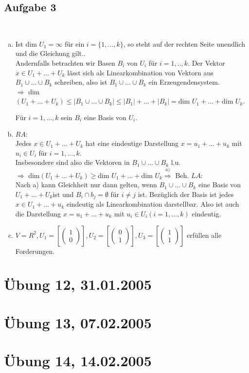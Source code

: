 \documentclass[a4paper,twoside,DIV15,BCOR12mm]{scrbook}
\newcommand{\enua}{\ \begin{enumerate}[a)]}
\newcommand{\une}{\end{enumerate}}
\newcommand{\RA}{\Rightarrow}
\newcommand{\vect}{\begin{pmatrix}}
\newcommand{\tcev}{\end{pmatrix}}
\begin{document}
\subsection {Aufgabe 3}
\enua
\item
Ist dim $U_1=\infty$ für ein $i=\{1,...,k\}$, so steht auf der rechten Seite unendlich und die Gleichung gilt..\\
Andernfalls betrachten wir Basen $B_i$ von $U_i$ für $i=1,..,k$. Der Vektor $x\in U_1+...+U_k$ lässt sich als Linearkombination von Vektorn aus $B_1\cup...\cup B_k$ schreiben, also ist $B_1\cup...\cup B_k$ ein Erzeugendensystem.\\
$\RA$ dim$(U_1+...+U_k)\le|B_1\cup...\cup B_k|\le|B_1|+...+|B_k|=\text{dim }U_1+...+\text{dim }U_k$.\par
Für $i=1,...,k$ sein $B_i$ eine Basis von $U_i$.
\item
$RA$:\\
Jedes $x\in U_1+...+U_k$ hat eine eindeutige Darstellung $x=u_1+...+u_k$ mit $u_i\in U_i$ für $i=1,...,k$.\\
Insbesondere sind also die Vektoren in $B_1\cup...\cup B_k$ l.u.\\
$\RA$ dim$(U_1+...+U_k)\ge$dim $U_1+...+$dim $U_k \overset{a)}{\RA}$ Beh.
$LA$:\\
Nach a) kann Gleichheit nur dann gelten, wenn $B_1\cup...\cup B_k$ eine Basis von $U_1+...+U_k$ist und $B_i\cap b_j=\emptyset$ für $i\ne j$ ist. Bezüglich der Basis ist jedes $x\in U_1+...+u_k$ eindeutig als Linearkombination darstellbar. Also ist auch die Darstellung $x=u_1+...+u_k$ mit $u_i\in U_i(i=1,...,k)$ eindeutig.
\item
$V=R^2, U_1=[\vect1\\0\tcev], U_2=[\vect0\\1\tcev], U_3=[\vect1\\1\tcev]$ erfüllen alle Forderungen.
\une


\section {Übung 12, 31.01.2005}
\section {Übung 13, 07.02.2005}
\section {Übung 14, 14.02.2005}
\end{document}
